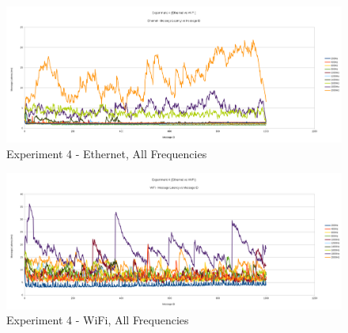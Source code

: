\documentclass[../dissertation.tex]{subfiles}
\begin{document}
\begin{figure}[H]
\centering
\includegraphics[width=\textwidth]{images/experiment4/ethernet_mean_times_pretty.png}
\caption{Experiment 4 - Ethernet, All Frequencies}
\label{exp4-ethernet-all-freq}
\end{figure}

\begin{figure}[H]
\centering
\includegraphics[width=\textwidth]{images/experiment4/wifi_mean_times_pretty.png}
\caption{Experiment 4 - WiFi, All Frequencies}
\label{exp4-wifi-all-freq}
\end{figure}
\end{document}
